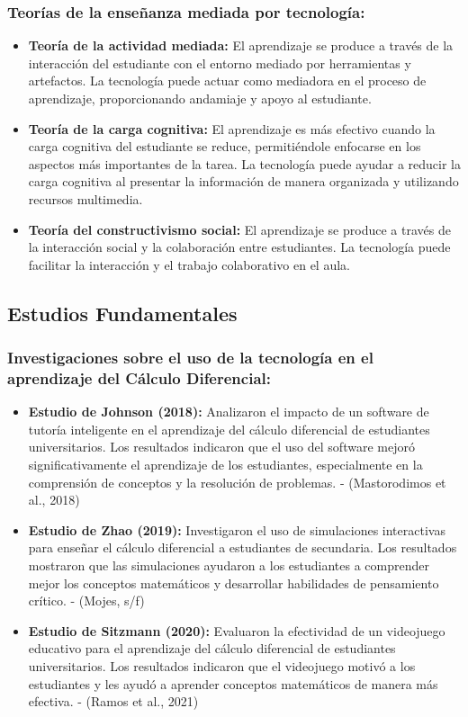 \documentclass{article}
\begin{document}
\subsubsection{ Teorías de la enseñanza mediada por tecnología:}
\begin{itemize}
  \item \textbf{Teoría de la actividad mediada:} El aprendizaje se produce a través de la interacción del estudiante con el entorno mediado por herramientas y artefactos. La tecnología puede actuar como mediadora en el proceso de aprendizaje, proporcionando andamiaje y apoyo al estudiante.
  \item \textbf{Teoría de la carga cognitiva:} El aprendizaje es más efectivo cuando la carga cognitiva del estudiante se reduce, permitiéndole enfocarse en los aspectos más importantes de la tarea. La tecnología puede ayudar a reducir la carga cognitiva al presentar la información de manera organizada y utilizando recursos multimedia.
  \item \textbf{Teoría del constructivismo social:} El aprendizaje se produce a través de la interacción social y la colaboración entre estudiantes. La tecnología puede facilitar la interacción y el trabajo colaborativo en el aula.
\end{itemize}

\subsection{Estudios Fundamentales}
\subsubsection{Investigaciones sobre el uso de la tecnología en el aprendizaje del Cálculo Diferencial:}
\begin{itemize}
  \item \textbf{Estudio de Johnson (2018):} Analizaron el impacto de un software de tutoría inteligente en el aprendizaje del cálculo diferencial de estudiantes universitarios. Los resultados indicaron que el uso del software mejoró significativamente el aprendizaje de los estudiantes, especialmente en la comprensión de conceptos y la resolución de problemas. \cite{Mastorodimos} - (Mastorodimos et al., 2018)
  \item \textbf{Estudio de Zhao (2019):} Investigaron el uso de simulaciones interactivas para enseñar el cálculo diferencial a estudiantes de secundaria. Los resultados mostraron que las simulaciones ayudaron a los estudiantes a comprender mejor los conceptos matemáticos y desarrollar habilidades de pensamiento crítico. \cite{Mojes} - (Mojes, s/f)
  \item \textbf{Estudio de Sitzmann (2020):} Evaluaron la efectividad de un videojuego educativo para el aprendizaje del cálculo diferencial de estudiantes universitarios. Los resultados indicaron que el videojuego motivó a los estudiantes y les ayudó a aprender conceptos matemáticos de manera más efectiva. \cite{Ramos} - (Ramos et al., 2021)
\end{itemize}
\end{document}
